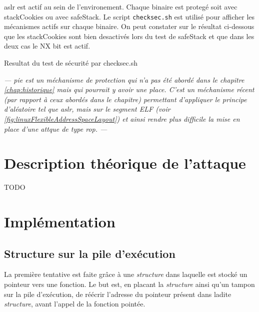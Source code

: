 \gls{aslr} est actif au sein de l'environement. Chaque binaire est protegé soit avec \gls{stackCookies} ou avec \gls{safeStack}. Le script \texttt{checksec.sh} \cite{CheckSec} est utilisé pour afficher les mécanismes actifs sur chaque binaire. On peut constater sur le résultat ci-dessous que les \gls{stackCookies} sont bien desactivés lors du test de \gls{safeStack} et que dans les deux cas le NX bit est actif.

\begin{listing}
	\caption{Resultat du test de sécurité par checksec.sh}
	\label{lst:checksecRes}
\end{listing}

\textit{--- \gls{pie} est un méchanisme de protection qui n'a pas été abordé dans le chapitre \ref{chap:historique} mais qui pourrait y avoir une place. C'est un méchanisme récent (par rapport à ceux abordés dans le chapitre) permettant d'appliquer le principe d'aléatoire tel que \gls{aslr}, mais sur le segment ELF (voir \autoref{fig:linuxFlexibleAddressSpaceLayout}) et ainsi rendre plus difficile la mise en place d'une attque de type \gls{rop}. ---}

\section{Description théorique de l'attaque}


TODO

\section{Implémentation}

\subsection{Structure sur la pile d'exécution}

La première tentative est faite grâce à une \textit{structure} dans laquelle est stocké un pointeur vers une fonction. Le but est, en placant la \textit{structure} ainsi qu'un tampon sur la pile d'exécution, de réécrir l'adresse du pointeur présent dans ladite \textit{structure}, avant l'appel de la fonction pointée.

